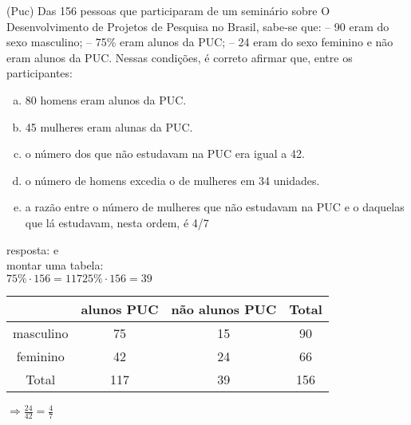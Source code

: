 \begin{ex}
(Puc) Das 156 pessoas que participaram de um seminário sobre O Desenvolvimento de Projetos de Pesquisa no Brasil, sabe-se que: 
– 90 eram do sexo masculino;
– 75\% eram alunos da PUC; 
– 24 eram do sexo feminino e não eram alunos da PUC. 
Nessas condições, é correto afirmar que, entre os participantes:   
 \begin{enumerate} [(a)]
     \item 80 homens eram alunos da PUC.
     \item 45 mulheres eram alunas da PUC. 
     \item o número dos que não estudavam na PUC era igual a 42.
     \item o número de homens excedia o de mulheres em 34 unidades.
     \item  a razão entre o número de mulheres que não estudavam na PUC e o daquelas que lá estudavam, nesta ordem, é  4/7
 \end{enumerate}
   \begin{sol}
     resposta: e \\
     montar uma tabela: \\
     $75\%\cdot156=117$\hspace{0.6cm}$25\%\cdot156=39$\\
     
       \begin{tabular}{|c|c|c|c|} \hline
            & alunos PUC & não alunos PUC & Total\\ \hline
          masculino  & 75 & 15 & 90 \\  \hline
          feminino & 42 & 24 & 66  \\  \hline
          Total & 117 & 39 & 156 \\  \hline
       \end{tabular}
       $\Longrightarrow  \frac{24}{42}=\frac{4}{7}$
   \end{sol}
\end{ex}